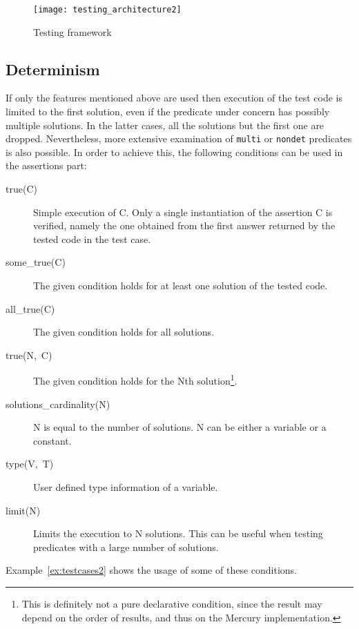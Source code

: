 \documentclass[british]{llncs}
\begin{document}
\begin{figure}
\begin{centering}
\texttt{[image: testing\_architecture2]}
\par\end{centering}

\caption{\label{fig:Testing-framework}Testing framework}

\end{figure}



\subsection{Determinism}

If only the features mentioned above are used then execution of the
test code is limited to the first solution, even if the predicate under concern has possibly multiple solutions. In the latter cases, all the solutions but the first one are dropped. Nevertheless, more
extensive examination of \texttt{multi} or \texttt{nondet} predicates
is also possible. In order to achieve this, the following conditions can be used in
the assertions part:
\begin{description}
\item [{true(C)}] Simple execution of C. Only a single instantiation of
the assertion C is verified, namely the one obtained from the first
answer returned by the tested code in the test case.
\item [{some\_true(C)}] The given condition holds for at least one solution
of the tested code.
\item [{all\_true(C)}] The given condition holds for all solutions.
\item [{true(N,~C)}] The given condition holds for the Nth solution\footnote{This is definitely not a pure declarative condition, since the result
may depend on the order of results, and thus on the Mercury implementation.}.
\item [{solutions\_cardinality(N)}] N is equal to the number of solutions.
N can be either a variable or a constant.
\item [{type(V,~T)}] User defined type information of a variable.
\item [{limit(N)}] Limits the execution to N solutions. This can be useful
when testing predicates with a large number
of solutions.
\end{description}
Example~\ref{ex:testcases2} shows the usage of some of these conditions. 
\end{document}
